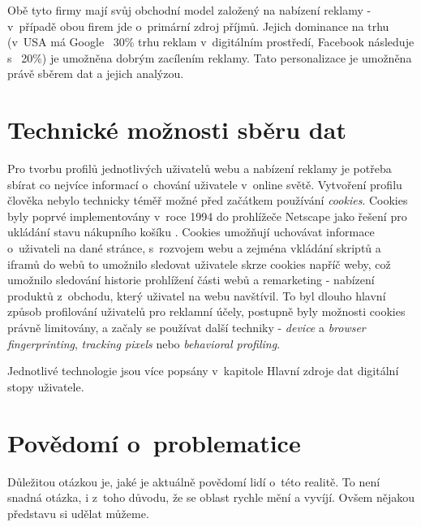 Obě tyto firmy mají svůj obchodní model založený na nabízení reklamy - v~případě obou firem jde o~primární zdroj příjmů. Jejich dominance na trhu (v~USA má Google ~30\% trhu reklam\citep{google-ads} v~digitálním prostředí, Facebook následuje s ~20\%) je umožněna dobrým zacílením reklamy. Tato personalizace je umožněna právě sběrem dat a jejich analýzou.



\section{Technické možnosti sběru dat}

Pro tvorbu profilů jednotlivých uživatelů webu a nabízení reklamy je potřeba sbírat co nejvíce informací o~chování uživatele v~online světě. Vytvoření profilu člověka nebylo technicky téměř možné před začátkem používání \textit{cookies}.
Cookies byly poprvé implementovány v~roce 1994 do prohlížeče Netscape jako řešení pro ukládání stavu nákupního košíku \citep{cookies-history}. Cookies umožňují uchovávat informace o~uživateli na dané stránce, s~rozvojem webu a zejména vkládání skriptů a iframů do webů to umožnilo sledovat uživatele skrze cookies napříč weby, což umožnilo sledování historie prohlížení části webů a remarketing - nabízení produktů z~obchodu, který uživatel na webu navštívil\citep{scott-cookies}. To byl dlouho hlavní způsob profilování uživatelů pro reklamní účely, postupně byly možnosti cookies právně limitovány, a začaly se používat další techniky - \textit{device} a \textit{browser fingerprinting}, \textit{tracking pixels} nebo \textit{behavioral profiling}.

Jednotlivé technologie jsou více popsány v~kapitole Hlavní zdroje dat digitální stopy uživatele.

\section{Povědomí o~problematice}

Důležitou otázkou je, jaké je aktuálně povědomí lidí o~této realitě. To není snadná otázka, i z~toho důvodu, že se oblast rychle mění a vyvíjí. Ovšem nějakou představu si udělat můžeme.

